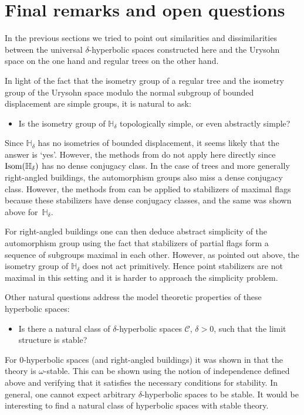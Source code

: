 \documentclass{amsart}
\renewcommand{\d}{\delta}
\renewcommand{\H}{\mathbb{H}}
\newcommand{\C}{\mathcal{C}}
\def\Isom{\mathop{\rm Isom}\nolimits}
\begin{document}
\section{Final remarks and open questions}


In the previous sections we tried to point out similarities and dissimilarities between the universal $\d$-hyperbolic spaces constructed here and the Urysohn space on the one hand and regular trees on the other hand.


In light of the fact that the isometry group of a regular tree and the isometry group of the Urysohn space modulo the normal subgroup of bounded  displacement are simple groups, it is natural to ask:
\begin{itemize}
\item Is the isometry group of $\H_\d$ topologically simple, or even abstractly simple?
\end{itemize}
 
Since $\H_\d$ has no isometries of bounded displacement, it seems likely that the answer is `yes'. However, the methods from \cite{TZ} do not apply here directly since $\Isom(\H_\d)$ has no dense conjugacy class. In the case of trees and more generally right-angled buildings, the automorphism groups also miss a dense conjugacy class. However, the methods from \cite{TZ} can be applied to stabilizers of maximal flags because these stabilizers have dense conjugacy classes,  and the same was shown above  for~$\H_\d$.

For right-angled buildings one can then deduce abstract simplicity of the automorphism group using the fact that stabilizers of partial flags form a sequence of subgroups maximal in each other. However, as pointed out above, the isometry group of $\H_\d$ does not act primitively. Hence point stabilizers are not maximal in this setting and it is harder to approach the simplicity problem.


Other natural questions address the model theoretic properties of these hyperbolic spaces:

\begin{itemize}

\item Is there a natural class of $\d$-hyperbolic spaces $\C$, $\d>0$, such that the limit structure is stable?
\end{itemize}


For $0$-hyperbolic spaces (and right-angled buildings) it was shown in \cite{pseudospace} that the theory is $\omega$-stable. This can be shown using the notion of independence defined above and verifying that it satisfies the necessary conditions for stability.
In general, one cannot expect arbitrary $\d$-hyperbolic spaces to be stable. It would be interesting to find a natural class of hyperbolic spaces with stable theory.
\end{document}
